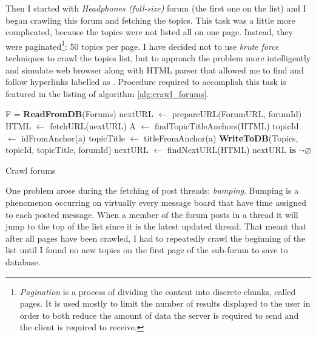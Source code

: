     Then I started with \emph{Headphones (full-size)} forum (the first one on the list) and I began crawling this forum and fetching the topics. This task was a little more complicated, because the topics were not listed all on one page. Instead, they were paginated\footnote{\emph{Pagination} is a process of dividing the content into discrete chunks, called pages. It is used mostly to limit the number of results displayed to the user in order to both reduce the amount of data the server is required to send and the client is required to receive.}: 50 topics per page. I have decided not to use \emph{brute force} techniques to crawl the topics list, but to approach the problem more intelligently and simulate web browser along with HTML parser that allowed me to find and follow hyperlinks labelled as . Procedure required to accomplish this task is featured in the listing of algorithm \ref{alg:crawl_forums}.
  
    \begin{algorithm}[H]
      \begin{algorithmic}[1]
          \State F = \textbf{ReadFromDB}(Forums) 
            \State nextURL $\gets$ prepareURL(ForumURL, forumId)
            \Repeat
              \State HTML $\gets$ fetchURL(nextURL)
              \State A $\gets$ findTopicTitleAnchors(HTML)
                \State topicId $\gets$ idFromAnchor(a)
                \State topicTitle $\gets$ titleFromAnchor(a)
                \State \textbf{WriteToDB}(Topics, topicId, topicTitle, forumId)
              \EndFor
              \State nextURL $\gets$ findNextURL(HTML) 
            \Until nextURL \textbf{is} $\neg\varnothing$
          \EndFor
        \EndProcedure
      \end{algorithmic}
      \caption{Crawl forums}
      \label{alg:crawl_forums}
    \end{algorithm}
    
    One problem arose during the fetching of post threads: \emph{bumping}. Bumping is a phenomenon occurring on virtually every message board that have time assigned to each posted message. When a member of the forum posts in a thread it will jump to the top of the list since it is the latest updated thread. That meant that after all pages have been crawled, I had to repeatedly crawl the beginning of the list until I found no new topics on the first page of the sub-forum to save to database.
    
